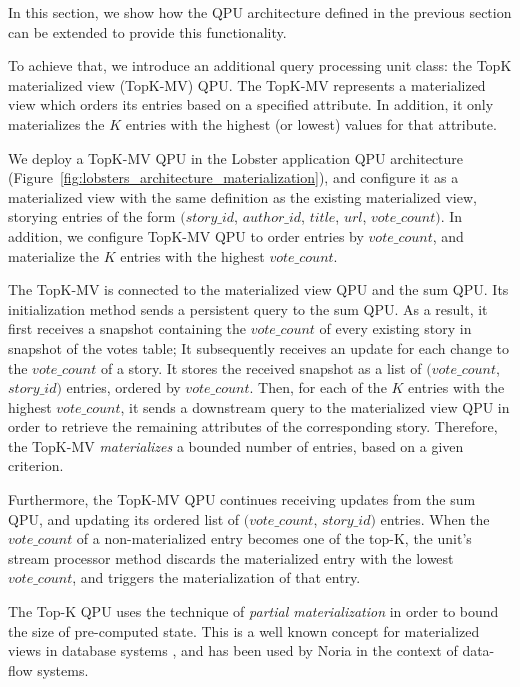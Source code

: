 In this section, we show how the QPU architecture defined in the previous section can be extended to provide this
functionality.

To achieve that, we introduce an additional query processing unit class: the TopK materialized view (TopK-MV) QPU.
The TopK-MV represents a materialized view which orders its entries based on a specified attribute.
In addition, it only materializes the $K$ entries with the highest (or lowest) values for that attribute.

We deploy a TopK-MV QPU in the Lobster application QPU architecture (Figure~\ref{fig:lobsters_architecture_materialization}),
and configure it as a materialized view with the same definition as the existing materialized view,
storying entries of the form $(story\_id$, $author\_id$, $title$, $url$, $vote\_count)$.
In addition, we configure TopK-MV QPU to order entries by $vote\_count$, and materialize the $K$ entries with the highest $vote\_count$.

The TopK-MV is connected to the materialized view QPU and the sum QPU.
Its initialization method sends a persistent query to the sum QPU.
As a result, it first receives a snapshot containing the $vote\_count$ of every existing story in snapshot of the votes table;
It subsequently receives an update for each change to the $vote\_count$ of a story.
It stores the received snapshot as a list of $(vote\_count$, $story\_id)$ entries, ordered by $vote\_count$.
Then, for each of the $K$ entries with the highest $vote\_count$,
it sends a downstream query to the materialized view QPU in order to retrieve the remaining attributes of the corresponding story.
Therefore, the TopK-MV \textit{materializes} a bounded number of entries, based on a given criterion.

Furthermore, the TopK-MV QPU continues receiving updates from the sum QPU, and updating its
ordered list of $(vote\_count$, $story\_id)$ entries.
When the $vote\_count$ of a non-materialized entry becomes one of the top-K,
the unit's stream processor method discards the materialized entry with the lowest $vote\_count$,
and triggers the materialization of that entry.

The Top-K QPU uses the technique of \textit{partial materialization} in order to bound the size of pre-computed state.
This is a well known concept for materialized views in database systems \cite{zhou:partiallymaterialized, zhou:dynamicmaterialized},
and has been used by Noria \cite{gjengset:noria} in the context of data-flow systems.

